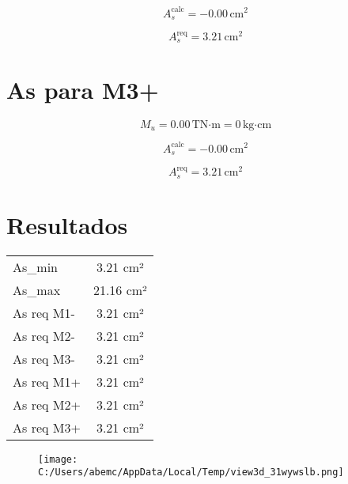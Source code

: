 \documentclass[12pt]{article}
\begin{document}
\[
A_s^{\text{calc}} = -0.00\,\text{cm}^2
\]

\[
A_s^{\text{req}} = 3.21\,\text{cm}^2
\]

\vspace{0.5cm}

\section*{ As para M3+ }

\[
M_u = 0.00\,\text{TN·m} = 0\,\text{kg·cm}
\]

\[
A_s^{\text{calc}} = -0.00\,\text{cm}^2
\]

\[
A_s^{\text{req}} = 3.21\,\text{cm}^2
\]

\vspace{0.5cm}



\section*{Resultados}
\begin{tabular}{|l|c|}
\hline

As_min & 3.21 cm² \\

As_max & 21.16 cm² \\

As req M1- & 3.21 cm² \\

As req M2- & 3.21 cm² \\

As req M3- & 3.21 cm² \\

As req M1+ & 3.21 cm² \\

As req M2+ & 3.21 cm² \\

As req M3+ & 3.21 cm² \\

\hline
\end{tabular}



\begin{figure}[H]
\centering
\texttt{[image: C:/Users/abemc/AppData/Local/Temp/view3d\_31wywslb.png]}
\end{figure}
\end{document}

